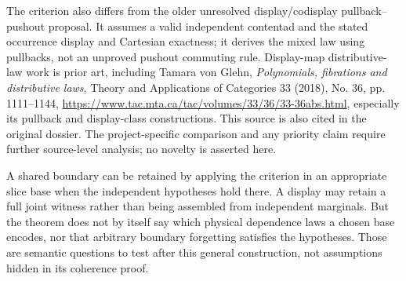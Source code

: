 \documentclass[11pt]{article}
\begin{document}
The criterion also differs from the older unresolved display/codisplay pullback--pushout proposal. It assumes a valid independent contentad and the stated occurrence display and Cartesian exactness; it derives the mixed law using pullbacks, not an unproved pushout commuting rule. Display-map distributive-law work is prior art, including Tamara von Glehn, \emph{Polynomials, fibrations and distributive laws}, Theory and Applications of Categories 33 (2018), No. 36, pp. 1111--1144, \url{https://www.tac.mta.ca/tac/volumes/33/36/33-36abs.html}, especially its pullback and display-class constructions. This source is also cited in the original dossier. The project-specific comparison and any priority claim require further source-level analysis; no novelty is asserted here.

A shared boundary can be retained by applying the criterion in an appropriate slice base when the independent hypotheses hold there. A display may retain a full joint witness rather than being assembled from independent marginals. But the theorem does not by itself say which physical dependence laws a chosen base encodes, nor that arbitrary boundary forgetting satisfies the hypotheses. Those are semantic questions to test after this general construction, not assumptions hidden in its coherence proof.
\end{document}
